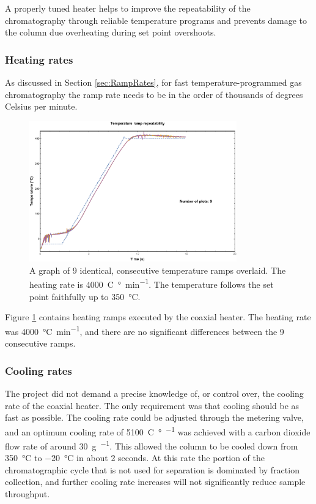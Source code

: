 A properly tuned heater helps to improve the repeatability of the chromatography
through reliable temperature programs and prevents damage to the column due
overheating during set point overshoots.

\subsubsection{Heating rates}

As discussed in Section \ref{sec:RampRates}, for fast temperature-programmed gas
chromatography the ramp rate needs to be in the order of thousands of degrees
Celsius per minute.

\begin{figure}
	\centering
	\includegraphics[width=0.8\textwidth]{Figures/high_rate_heating.pdf}
	\decoRule
		
	\caption[Heating rate illustration]{A graph of 9 identical, consecutive
	temperature ramps overlaid. The heating rate is \SI{4000}{C\degree\per\minute}.
	The temperature follows the set point faithfully up to \SI{350}{\celsius}.}

	\label{fig:4000K/min} 
\end{figure}

Figure \ref{fig:4000K/min} contains heating ramps executed by the coaxial
heater. The heating rate was \SI{4000}{\celsius\per\minute}, and there are no
significant differences between the 9 consecutive ramps.

\subsubsection{Cooling rates}

The project did not demand a precise knowledge of, or control over, the cooling
rate of the coaxial heater. The only requirement was that cooling should be as
fast as possible. The cooling rate could be adjusted through the metering valve,
and an optimum cooling rate of \SI{5100}{C\degree\per\min} was achieved with a
carbon dioxide flow rate of around \SI{30}{\gram\per\min}. This allowed the
column to be cooled down from \SI{350}{\celsius} to \SI{-20}{\celsius} in about
2 seconds. At this rate the portion of the chromatographic cycle that is not
used for separation is dominated by fraction collection, and further cooling
rate increases will not significantly reduce sample throughput.

